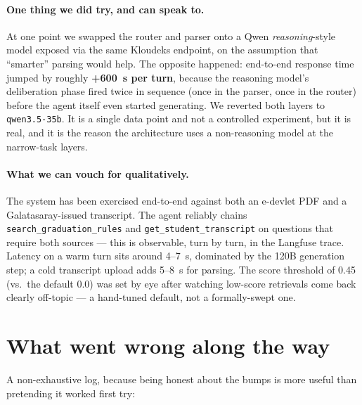 \documentclass[11pt,a4paper]{article}
\begin{document}
\paragraph{One thing we did try, and can speak to.} At one point we swapped the
router and parser onto a Qwen \emph{reasoning}-style model exposed via the same
Kloudeks endpoint, on the assumption that ``smarter'' parsing would help. The
opposite happened: end-to-end response time jumped by roughly \textbf{+600~s
per turn}, because the reasoning model's deliberation phase fired twice in
sequence (once in the parser, once in the router) before the agent itself even
started generating. We reverted both layers to \texttt{qwen3.5-35b}. It is a
single data point and not a controlled experiment, but it is real, and it is
the reason the architecture uses a non-reasoning model at the narrow-task
layers.

\paragraph{What we can vouch for qualitatively.} The system has been exercised
end-to-end against both an e-devlet PDF and a Galatasaray-issued transcript.
The agent reliably chains \texttt{search\_graduation\_rules} and
\texttt{get\_student\_transcript} on questions that require both sources ---
this is observable, turn by turn, in the Langfuse trace. Latency on a warm
turn sits around 4--7~s, dominated by the 120B generation step; a cold
transcript upload adds 5--8~s for parsing. The score threshold of 0.45 (vs.\
the default 0.0) was set by eye after watching low-score retrievals come back
clearly off-topic --- a hand-tuned default, not a formally-swept one.

\section{What went wrong along the way}

A non-exhaustive log, because being honest about the bumps is more useful than
pretending it worked first try:
\end{document}

